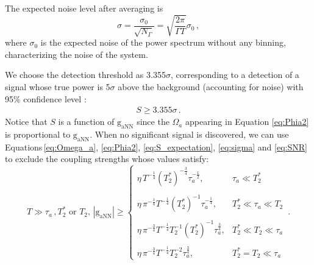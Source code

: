 The expected noise level after averaging is
\begin{equation}
    \sigma = \dfrac{\sigma_{0}}{\sqrt{N_{\Gamma} }} = \sqrt{\dfrac{2\pi }{\Gamma T}} \sigma_{0}
    \,,\label{eq:sigma}
\end{equation} 
where $\sigma_{0}$ is the expected noise of the power spectrum without any binning, characterizing the noise of the system. 

We choose the detection threshold as 3.355$\sigma$, corresponding to a detection of a signal whose true power is 5$\sigma$ above the background  (accounting for noise) with 95\% confidence level \cite{Gramolin2021NaturePhysics, Brubaker_PhysRevD.96.123008}:
\begin{align}
    S \geqslant 3.355 \sigma
    \,. \label{eq:SNR}
\end{align}
Notice that $S$ is a function of $\mathrm{g_{aNN}}$ since the $\Omega_a$ appearing in Equation \eqref{eq:Phia2} is proportional to $\mathrm{g_{aNN}}$. 
When no significant signal is discovered, we can use Equations\,\eqref{eq:Omega_a}, \eqref{eq:Phia2}, \eqref{eq:S_expectation}, \eqref{eq:sigma} and \eqref{eq:SNR} to exclude the coupling strengths whose values satisfy:
\begin{equation}
    T\gg\tau_a\,,T_2^*\, \,\text{or}\,\,T_2,\, |\mathrm{g_{aNN}}| \geqslant 
    \left\{
    \begin{array}{cl}
    \eta\, T^{-\frac{1}{4}} (T_2^*)^{-\frac{3}{4}} \tau_a^{-\frac{1}{2}} ,
    & \tau_a\ll T_2^* \\
    & \\
    \eta\, \pi^{-\frac{1}{4}} T^{-\frac{1}{4}} (T_2^*)^{-1} \tau_a^{-\frac{1}{4}} ,
    &  T_2^*\ll\tau_a \ll T_2\\
    & \\
    \eta\, \pi^{-\frac{3}{4}} T^{-\frac{1}{4}} T_2^{-1} (T_2^*)^{-1} \tau_a^{\frac{3}{4}}  ,
    &  T_2^*\ll T_2\ll\tau_a \\
    & \\
    \eta\, \pi^{-\frac{3}{4}} T^{-\frac{1}{4}} T_2^{-2} \tau_a^{\frac{3}{4}}   ,
    &  T_2^*= T_2\ll\tau_a
    \end{array} \right.
    \,. \label{eq:exclusion_threshold}
\end{equation}
